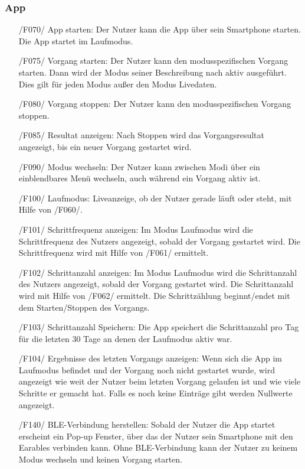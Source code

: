 \documentclass[a4paper,12pt]{article}
\begin{document}
    \subsubsection{App}
      \begin{itemize}
      \item[/F070/] \textsf{App starten:} Der Nutzer kann die App über sein Smartphone starten. Die App startet im Laufmodus.
      \item[/F075/] \textsf{Vorgang starten:} Der Nutzer kann den modusspezifischen \Gls{Vorgang} starten. Dann wird der Modus seiner Beschreibung nach aktiv ausgeführt. Dies gilt für jeden Modus außer den Modus \glqq Livedaten\grqq.%
      \item[/F080/] \textsf{Vorgang stoppen:} Der Nutzer kann den modusspezifischen \Gls{Vorgang} stoppen.
      \item[/F085/] \textsf{Resultat anzeigen:} Nach Stoppen wird das Vorgangsresultat angezeigt, bis ein neuer \Gls{Vorgang} gestartet wird.
      \item[/F090/] \textsf{Modus wechseln:} Der Nutzer kann zwischen Modi über ein einblendbares Menü wechseln, auch während ein Vorgang aktiv ist.
      \item[/F100/] \textsf{Laufmodus:} Liveanzeige, ob der Nutzer gerade \glqq läuft\grqq{} oder \glqq steht\grqq{}, mit Hilfe von /F060/.
      \item[/F101/] \textsf {Schrittfrequenz anzeigen:} Im Modus \glqq{}Laufmodus\grqq{} wird die Schrittfrequenz des Nutzers angezeigt, sobald der Vorgang gestartet wird. Die Schrittfrequenz wird mit Hilfe von /F061/ ermittelt.
      \item[/F102/] \textsf {Schrittanzahl anzeigen:} Im Modus \glqq{}Laufmodus\grqq{} wird die Schrittanzahl des Nutzers angezeigt, sobald der Vorgang gestartet wird. Die Schrittanzahl wird mit Hilfe von /F062/ ermittelt. Die Schrittzählung beginnt/endet mit dem Starten/Stoppen des Vorgangs.
      \item[/F103/] \textsf{Schrittanzahl Speichern:} Die App speichert die Schrittanzahl pro Tag für die letzten 30 Tage an denen der Laufmodus aktiv war.
      \item[/F104/] \textsf{Ergebnisse des letzten Vorgangs anzeigen:} Wenn sich die App im Laufmodus befindet und der Vorgang noch nicht gestartet wurde, wird angezeigt wie weit der Nutzer beim letzten Vorgang gelaufen ist und wie viele Schritte er gemacht hat. Falls es noch keine Einträge gibt werden Nullwerte angezeigt.
      \item[/F140/] \textsf{BLE-Verbindung herstellen:} Sobald der Nutzer die App startet erscheint ein Pop-up Fenster, über das der Nutzer sein Smartphone mit den \gls{Earables} verbinden kann. Ohne BLE-Verbindung kann der Nutzer zu keinem Modus wechseln und keinen Vorgang starten.

\end{itemize}
\end{document}

